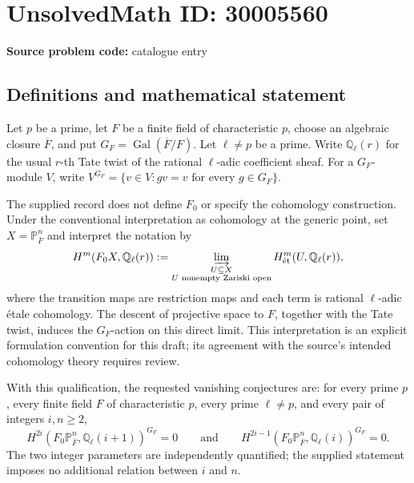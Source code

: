 \documentclass[11pt]{article}
\begin{document}
\section*{UnsolvedMath ID: 30005560}
\textbf{Source problem code:} catalogue entry
\subsection{Definitions and mathematical statement}
Let \(p\) be a prime, let \(F\) be a finite field of characteristic \(p\), choose an algebraic closure \(\overline F\), and put \(G_F=\operatorname{Gal}(\overline F/F)\). Let \(\ell\ne p\) be a prime. Write \(\mathbb Q_\ell(r)\) for the usual \(r\)-th Tate twist of the rational \(\ell\)-adic coefficient sheaf. For a \(G_F\)-module \(V\), write \(V^{G_F}=\{v\in V:gv=v\text{ for every }g\in G_F\}\).

The supplied record does not define \(F_0\) or specify the cohomology construction. Under the conventional interpretation as cohomology at the generic point, set \(X=\mathbb P^n_{\overline F}\) and interpret the notation by
\[
H^m(F_0X,\mathbb Q_\ell(r))
:=\varinjlim_{\substack{U\subseteq X\\ U\text{ nonempty Zariski open}}}
H^m_{\mathrm{\acute et}}(U,\mathbb Q_\ell(r)),
\]
where the transition maps are restriction maps and each term is rational \(\ell\)-adic étale cohomology. The descent of projective space to \(F\), together with the Tate twist, induces the \(G_F\)-action on this direct limit. This interpretation is an explicit formulation convention for this draft; its agreement with the source's intended cohomology theory requires review.

With this qualification, the requested vanishing conjectures are: for every prime \(p\), every finite field \(F\) of characteristic \(p\), every prime \(\ell\ne p\), and every pair of integers \(i,n\ge 2\),
\[
H^{2i}\!\left(F_0\mathbb P^n_{\overline F},\mathbb Q_\ell(i+1)\right)^{G_F}=0
\qquad\text{and}\qquad
H^{2i-1}\!\left(F_0\mathbb P^n_{\overline F},\mathbb Q_\ell(i)\right)^{G_F}=0.
\]
The two integer parameters are independently quantified; the supplied statement imposes no additional relation between \(i\) and \(n\).
\end{document}
